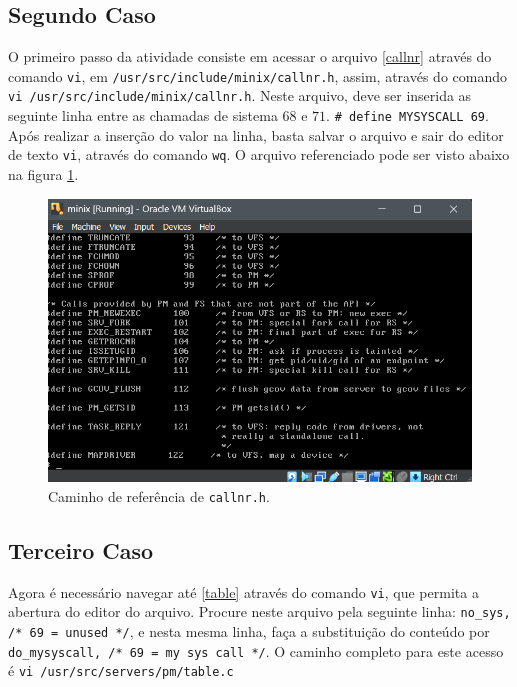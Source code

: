 \documentclass[12pt]{article}
\begin{document}
\subsection{Segundo Caso} \label{sec:2sec}
O primeiro passo da atividade consiste em acessar o arquivo \ref{callnr} através do comando \texttt{vi}, em \lstinline{/usr/src/include/minix/callnr.h}, assim, através do comando
\lstinline{vi /usr/src/include/minix/callnr.h}. Neste arquivo, deve ser inserida as seguinte linha entre as chamadas de sistema $68$ e $71$. \lstinline{# define MYSYSCALL 69}.
Após realizar a inserção do valor na linha, basta salvar o arquivo e sair do editor de texto \texttt{vi}, através do comando \lstinline{wq}. O arquivo referenciado pode ser visto
abaixo na figura \ref{fig1}.

\begin{figure}[htbp]
    \centering
    \includegraphics[scale=0.6]{out/fig/Screenshot 2024-12-23 112211}
    \caption{Caminho de referência de \texttt{callnr.h}.}
    \label{fig1}
\end{figure}

\subsection{Terceiro Caso} \label{sec:3sec}
Agora é necessário navegar até \ref{table} através do comando \lstinline{vi}, que permita a abertura do editor do arquivo. Procure neste arquivo pela seguinte linha:
\lstinline{no_sys, /* 69 = unused */}, e nesta mesma linha, faça a substituição do conteúdo por \lstinline{do_mysyscall, /* 69 = my sys call */}. O caminho completo para este
acesso é \lstinline{vi /usr/src/servers/pm/table.c}
\end{document}
